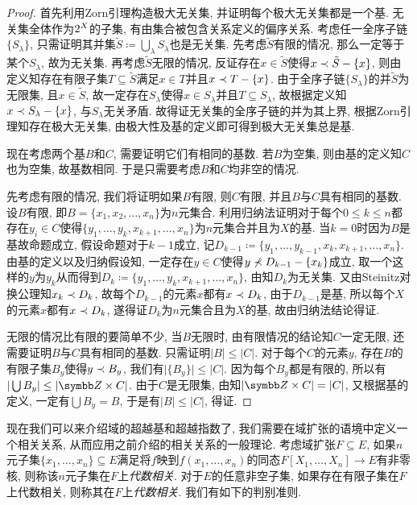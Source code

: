 \begin{proof}
  首先利用Zorn引理构造极大无关集, 并证明每个极大无关集都是一个基. 无关集全体作为$2^{X}$的子集, 有由集合被包含关系定义的偏序关系. 考虑任一全序子链$\{S_\lambda\}$, 只需证明其并集$\tilde{S}\coloneq \bigcup_\lambda S_\lambda$也是无关集. 先考虑$\tilde{S}$有限的情况, 那么一定等于某个$S_\lambda$, 故为无关集. 再考虑$\tilde{S}$无限的情况, 反证存在$x\in \tilde{S}$使得$x\prec \tilde{S}-\{x\}$, 则由定义知存在有限子集$T\subseteq\tilde{S}$满足$x\in T$并且$x\prec T-\{x\}$. 由于全序子链$\{S_\lambda\}$的并$\tilde{S}$为无限集, 且$x\in \tilde{S}$, 故一定存在$S_\lambda$使得$x\in S_\lambda$并且$T\subseteq S_\lambda$, 故根据定义知$x\prec S_\lambda-\{x\}$, 与$S_\lambda$无关矛盾. 故得证无关集的全序子链的并为其上界, 根据Zorn引理知存在极大无关集, 由极大性及基的定义即可得到极大无关集总是基.

  现在考虑两个基$B$和$C$, 需要证明它们有相同的基数. 若$B$为空集, 则由基的定义知$C$也为空集, 故基数相同. 于是只需要考虑$B$和$C$均非空的情况.

  先考虑有限的情况, 我们将证明如果$B$有限, 则$C$有限, 并且$B$与$C$具有相同的基数. 设$B$有限, 即$B=\{x_1, x_2, \dotsc, x_n\}$为$n$元集合. 利用归纳法证明对于每个$0\leq k\leq n$都存在$y_i\in C$使得$\{y_1, \dotsc, y_k, x_{k+1}, \dotsc, x_n\}$为$n$元集合并且为$X$的基. 当$k=0$时因为$B$是基故命题成立, 假设命题对于$k-1$成立, 记$D_{k-1}\coloneq \{y_1, \dotsc, y_{k-1}, x_k, x_{k+1}, \dotsc, x_n\}$. 由基的定义以及归纳假设知, 一定存在$y\in C$使得$y\nprec D_{k-1}-\{x_k\}$成立, 取一个这样的$y$为$y_k$从而得到$D_k\coloneq \{y_1, \dotsc, y_k, x_{k+1}, \dotsc, x_n\}$, 由知$D_k$为无关集. 又由Steinitz对换公理知$x_k\prec D_k$, 故每个$D_{k-1}$的元素$x$都有$x\prec D_k$, 由于$D_{k-1}$是基, 所以每个$X$的元素$x$都有$x\prec D_{k}$, 遂得证$D_k$为$n$元集合且为$X$的基, 故由归纳法结论得证.

  无限的情况比有限的要简单不少, 当$B$无限时, 由有限情况的结论知$C$一定无限, 还需要证明$B$与$C$具有相同的基数. 只需证明$\vert B\vert\leq \vert C\vert$. 对于每个$C$的元素$y$, 存在$B$的有限子集$B_y$使得$y\prec B_y$, 我们有$\vert \{B_y\}\vert\leq \vert C\vert$. 因为每个$B_y$都是有限的, 所以有$\vert\bigcup B_y\vert\leq \vert\ZZ\times C\vert$. 由于$C$是无限集, 由知$\vert\ZZ\times C\vert=\vert C\vert$, 又根据基的定义, 一定有$\bigcup B_y=B$, 于是有$\vert B\vert\leq\vert C\vert$, 得证.
\end{proof}

现在我们可以来介绍域的超越基和超越指数了, 我们需要在域扩张的语境中定义一个相关关系, 从而应用之前介绍的相关关系的一般理论. 考虑域扩张$F\subseteq E$, 如果$n$元子集$\{x_1, \dotsc, x_n\}\subseteq E$满足将$f$映到$f(x_1, \dotsc, x_n)$的同态$F[X_1, \dotsc, X_n]\to E$有非零核, 则称该$n$元子集在$F$上\emph{代数相关}. 对于$E$的任意非空子集, 如果存在有限子集在$F$上代数相关, 则称其在$F$上\emph{代数相关}. 我们有如下的判别准则.

